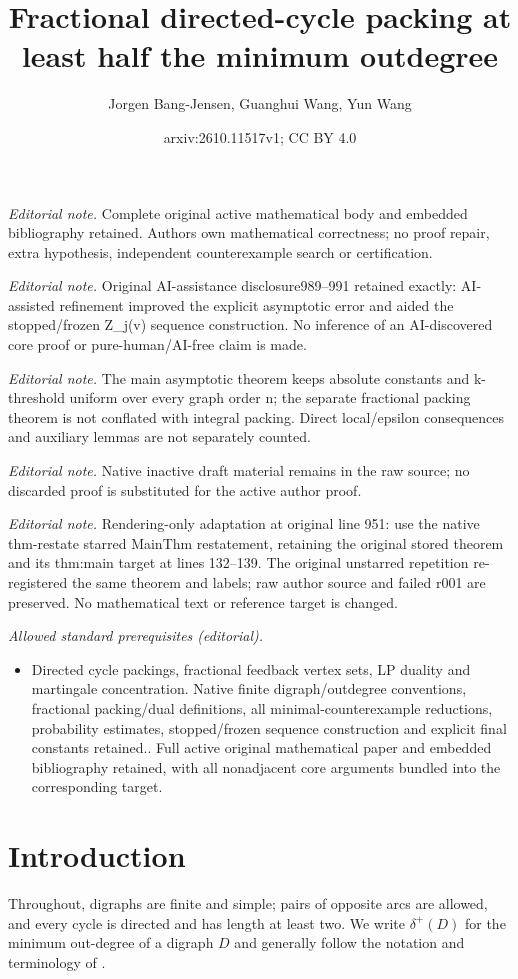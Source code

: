 \documentclass[10pt,a4paper]{article}
\title{Fractional directed-cycle packing at least half the minimum outdegree}
\author{Jorgen Bang-Jensen, Guanghui Wang, Yun Wang}
\date{arxiv:2610.11517v1; CC BY 4.0}
\numberwithin{equation}{section}
\begin{document}
\maketitle
\noindent\textit{Editorial note.} Complete original active mathematical body and embedded bibliography retained. Authors own mathematical correctness; no proof repair, extra hypothesis, independent counterexample search or certification.\par\medskip
\noindent\textit{Editorial note.} Original AI-assistance disclosure989--991 retained exactly: AI-assisted refinement improved the explicit asymptotic error and aided the stopped/frozen Z\_j(v) sequence construction. No inference of an AI-discovered core proof or pure-human/AI-free claim is made.\par\medskip
\noindent\textit{Editorial note.} The main asymptotic theorem keeps absolute constants and k-threshold uniform over every graph order n; the separate fractional packing theorem is not conflated with integral packing. Direct local/epsilon consequences and auxiliary lemmas are not separately counted.\par\medskip
\noindent\textit{Editorial note.} Native inactive draft material remains in the raw source; no discarded proof is substituted for the active author proof.\par\medskip
\noindent\textit{Editorial note.} Rendering-only adaptation at original line 951: use the native thm-restate starred MainThm restatement, retaining the original stored theorem and its thm:main target at lines 132--139. The original unstarred repetition re-registered the same theorem and labels; raw author source and failed r001 are preserved. No mathematical text or reference target is changed.\par\medskip
\noindent\textit{Allowed standard prerequisites (editorial).}\begin{itemize}
\item Directed cycle packings, fractional feedback vertex sets, LP duality and martingale concentration. Native finite digraph/outdegree conventions, fractional packing/dual definitions, all minimal-counterexample reductions, probability estimates, stopped/frozen sequence construction and explicit final constants retained.. Full active original mathematical paper and embedded bibliography retained, with all nonadjacent core arguments bundled into the corresponding target.
\end{itemize}\medskip
\section{Introduction}
Throughout, digraphs are finite and simple; pairs of
opposite arcs are allowed, and every cycle is directed and has length at
least two. We write $\delta^+(D)$ for the minimum out-degree of a
digraph $D$ and generally follow the notation and terminology of \cite{bang2009}.
\end{document}
